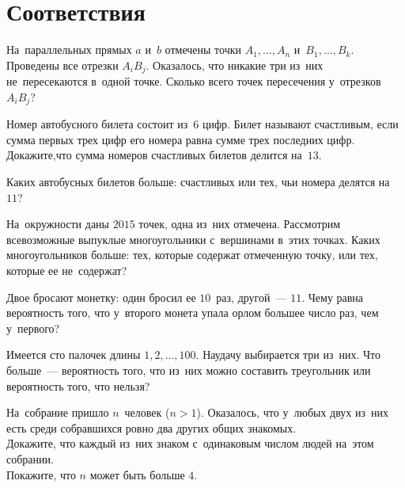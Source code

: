 
\section*{Соответствия}


\begin{problems}

\item
На~параллельных прямых $a$ и~$b$ отмечены точки $A_1, \ldots, A_n$
и~$B_1, \ldots, B_k$.
Проведены все отрезки $A_i B_j$.
Оказалось, что никакие три из~них не~пересекаются в~одной точке.
Сколько всего точек пересечения у~отрезков~$A_i B_j$?

\item
Номер автобусного билета состоит из~$6$ цифр.
Билет называют счастливым, если сумма первых трех цифр его номера равна сумме
трех последних цифр.
Докажите,что сумма номеров счастливых билетов делится на~$13$.

\item
Каких автобусных билетов больше: счастливых или тех, чьи номера делятся на~$11$?

\item
На~окружности даны $2015$ точек, одна из~них отмечена.
Рассмотрим всевозможные выпуклые многоугольники с~вершинами в~этих точках.
Каких многоугольников больше: тех, которые содержат отмеченную точку, или тех,
которые ее не~содержат?

\item
Двое бросают монетку: один бросил ее $10$~раз, другой~--- $11$.
Чему равна вероятность того, что у~второго монета упала орлом большее число
раз, чем у~первого?

\item
Имеется сто палочек длины $1, 2, \ldots, 100$.
Наудачу выбирается три из~них.
Что больше~--- вероятность того, что из~них можно составить треугольник или
вероятность того, что нельзя?

\item
На~собрание пришло $n$~человек ($n > 1$).
Оказалось, что у~любых двух из~них есть среди собравшихся ровно два других
общих знакомых.
\\
\subproblem
Докажите, что каждый из~них знаком с~одинаковым числом людей на~этом собрании.
\\
\subproblem
Покажите, что $n$ может быть больше $4$.

\end{problems}

